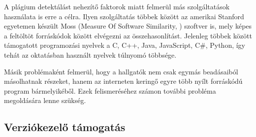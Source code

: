 A plágium detektálást nehezítő faktorok miatt felmerül más szolgáltatások használata is erre a célra. Ilyen szolgáltatás többek között az amerikai Stanford egyetemen készült Moss (Measure Of Software Similarity, \cite{Moss}) szoftver is, mely képes a feltöltöt forráskódok között elvégezni az összehasonlítást. Jelenleg többek között támogatott programozási nyelvek a C, C++, Java, JavaScript, C\#, Python, így tehát az oktatásban használt nyelvek túlnyomó többsége.

Másik problémaként felmerül, hogy a hallgatók nem csak egymás beadásaiból másolhatnak részeket, hanem az interneten keringő egyre több nyílt forráskódú program bármelyikéből. Ezek felismeréséhez számon további probléma megoldására lenne szükség.

\subsection{Verziókezelő támogatás}